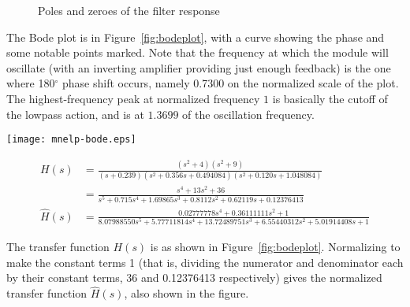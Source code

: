 \begin{figure}
\hspace*{\fill}\hspace*{\fill}\par
\caption{Poles and zeroes of the filter response}\label{fig:polezero}
\end{figure}

The Bode plot is in Figure~\ref{fig:bodeplot}, with a curve showing the
phase and some notable points marked.  Note that the frequency at which the
module will oscillate (with an inverting amplifier providing just enough
feedback) is the one where 180$^\circ$ phase shift occurs, namely 0.7300 on
the normalized scale of the plot.  The highest-frequency peak at normalized
frequency $1$ is basically the cutoff of the lowpass action, and is at
$1.3699$ of the oscillation frequency.

\begin{figure*}
{\hspace*{\fill}\texttt{[image: mnelp-bode.eps]}\hspace*{\fill}\par}
\begin{align*}
  H(s) &=
    \frac{(s^2+4)(s^2+9)}{(s+0.239)(s^2+0.356s+0.494084)(s^2+0.120s+1.048084)}
  \\
  &=
  \frac{s^4+13s^2+36}{s^5+0.715s^4+1.69865s^3+0.8112s^2+0.62119s+0.12376413}
  \\
  \hat{H}(s) &= \frac{0.02777778s^4+0.36111111s^2+1}{8.07988550s^5+
    5.77711814s^4+13.72489751s^3+6.55440312s^2+5.01914408s+1}
\end{align*}
\caption{Bode plot and formulas for the filter response}\label{fig:bodeplot}
\end{figure*}

The transfer function $H(s)$ is as shown in Figure~\ref{fig:bodeplot}.
Normalizing to make the constant terms 1 (that is, dividing the numerator
and denominator each by their constant terms, 36 and 0.12376413 respectively)
gives the normalized transfer function $\hat{H}(s)$, also shown in the
figure.

